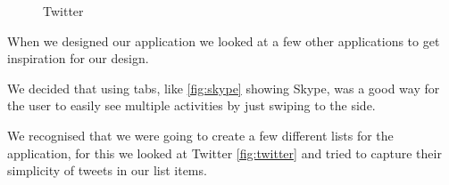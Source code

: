 \begin{figure}[H]
\begin{minipage}[b]{0.5\columnwidth}
\caption{Twitter\label{fig:twitter}}
\end{minipage}
\end{figure}

When we designed our application we looked at a few other applications to get inspiration for our design.

We decided that using tabs, like \autoref{fig:skype} showing Skype, was a good way for the user to easily see multiple activities by just swiping to the side.

We recognised that we were going to create a few different lists for the application, for this we looked at Twitter \autoref{fig:twitter} and tried to capture their simplicity of tweets in our list items.
